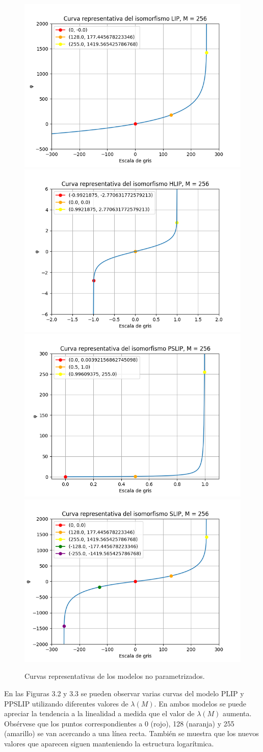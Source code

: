 \begin{figure}[h]
	\begin{center}
		\includegraphics[width=5.5 cm]{images/clasics_curves/lip_curve.png}
		\includegraphics[width=5.5 cm]{images/clasics_curves/hlip_curve.png}
		\includegraphics[width=5.5 cm]{images/clasics_curves/pslip_curve.png}
		\includegraphics[width=5.5 cm]{images/clasics_curves/slip_curve.png}
		\caption{Curvas representativas de los modelos no parametrizados.}
	\end{center}
\end{figure}

En las Figuras 3.2 y 3.3 se pueden observar varias curvas del modelo PLIP y PPSLIP utilizando diferentes valores de $\lambda(M)$. En ambos modelos se puede apreciar la tendencia a la linealidad a medida que el valor de $\lambda(M)$ aumenta. Obs\'ervese que los puntos correspondientes a 0 (rojo), 128 (naranja) y 255 (amarillo) se van acercando a una l\'inea recta. Tambi\'en se muestra que los nuevos valores que aparecen siguen manteniendo la estructura logar\'itmica.

